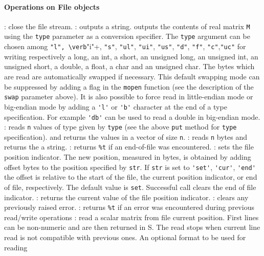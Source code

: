 \paragraph{Operations on File objects}
\begin{itemize}
  : close the file stream.
  : outputs a string. 
   outputs the contents of real matrix \verb+M+ using 
  the \verb!type! parameter as a conversion specifier. The \verb+type+ argument can be chosen 
  among \verb+"l", \verb+"i"+, \verb+"s"+, \verb+"ul"+, \verb+"ui"+, \verb+"us"+, \verb+"d"+, \verb+"f"+, 
  \verb+"c"+,\verb+"uc"+ for writing respectively a long, an int, a short, an unsigned long, 
  an unsigned int, an unsigned short, a double, a float, a char and an unsigned char. 
  The bytes which are read are automatically swapped if necessary. 
  This default swapping mode can be suppressed by adding a flag in the \verb!mopen! function 
  (see the description of the \verb+swap+ parameter above).
  It is also possible to force read in little-endian mode or big-endian mode by adding a \verb+'l'+ or \verb+'b'+  
  character at the end of a type specification. For example \verb+'db'+ can be used to read a double 
  in big-endian mode. 
  : reads \verb+n+ values of type given by \verb+type+ 
  (see the above \verb+put+ method for \verb+type+ specification).
  and returns the values in a vector of size \verb+n+. 
  : reads \verb+n+ bytes and returns the a string.
  : returns \verb+%t+ if an end-of-file was encountered. 
  :  sets  the  file  position indicator. The new position, 
  measured in bytes, is obtained by adding offset bytes to  the
  position  specified by \verb+str+. If \verb+str+ is set to \verb+'set'+, \verb+'cur'+, 
  \verb+'end'+ the offset is relative to the start of the file, 
  the current position indicator, or  end of file,  respectively. The default value 
  is \verb+set+.
  Successful call clears the end of file indicator.
  : returns the current value of the file position indicator. 
  : clears any previously raised error.
  : returns \verb+%t+ if an error was encountered during previous read/write 
  operations 
  : read a scalar matrix from file current position. 
  First lines can be non-numeric and are then returned in S. The read stops when current 
  line read is not compatible with previous ones. An optional format to be used for reading

\end{itemize}
